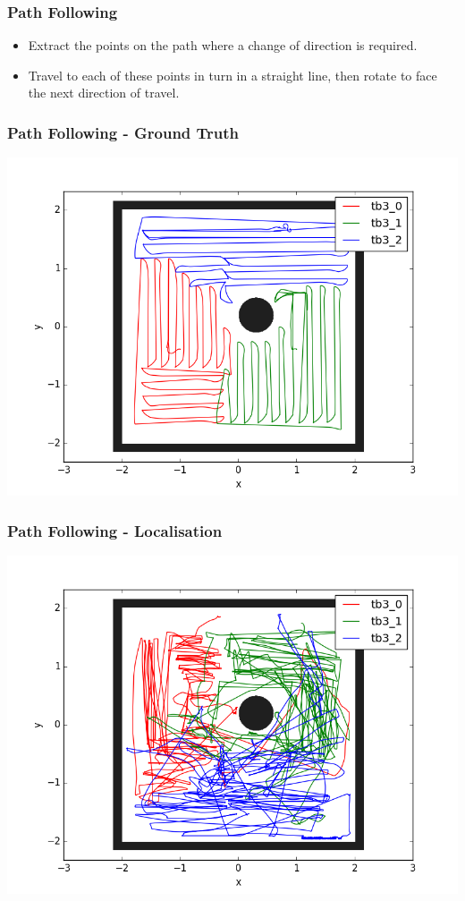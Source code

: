 \documentclass{beamer}
\begin{document}
	\begin{frame}
		\frametitle{Path Following}
		\begin{itemize}
			\item Extract the points on the path where a change of direction is required.
			\item Travel to each of these points in turn in a straight line, then rotate to face the next direction of travel.
		\end{itemize}
	\end{frame}
	\begin{frame}
		\frametitle{Path Following - Ground Truth}
		\centering
		\includegraphics[width=\linewidth]{30min_gt_simple}
	\end{frame}
	\begin{frame}
		\frametitle{Path Following - Localisation}
		\centering
		\includegraphics[width=\linewidth]{30min_loc_simple}
	\end{frame}
\end{document}
